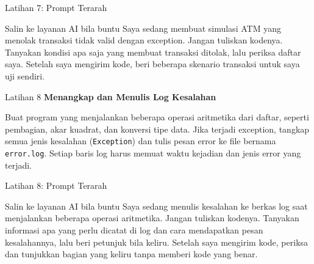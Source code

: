 \documentclass[aspectratio=169, table]{beamer}
\begin{document}
\begin{frame}{Latihan 7: Prompt Terarah}
\begin{block}{Salin ke layanan AI bila buntu}
\small Saya sedang membuat simulasi ATM yang menolak transaksi tidak valid dengan exception. Jangan tuliskan kodenya. Tanyakan kondisi apa saja yang membuat transaksi ditolak, lalu periksa daftar saya. Setelah saya mengirim kode, beri beberapa skenario transaksi untuk saya uji sendiri.
\end{block}
\end{frame}

\begin{frame}[fragile,allowframebreaks=0.8]{Latihan 8}
\footnotesize
\textbf{Menangkap dan Menulis Log Kesalahan}\par\medskip
Buat program yang menjalankan beberapa operasi aritmetika dari daftar, seperti pembagian, akar kuadrat, dan konversi tipe data.  
    Jika terjadi exception, tangkap semua jenis kesalahan (\texttt{Exception}) dan tulis pesan error ke file bernama \texttt{error.log}.  
    Setiap baris log harus memuat waktu kejadian dan jenis error yang terjadi.
\end{frame}

\begin{frame}{Latihan 8: Prompt Terarah}
\begin{block}{Salin ke layanan AI bila buntu}
\small Saya sedang menulis kesalahan ke berkas log saat menjalankan beberapa operasi aritmetika. Jangan tuliskan kodenya. Tanyakan informasi apa yang perlu dicatat di log dan cara mendapatkan pesan kesalahannya, lalu beri petunjuk bila keliru. Setelah saya mengirim kode, periksa dan tunjukkan bagian yang keliru tanpa memberi kode yang benar.
\end{block}
\end{frame}
\end{document}
